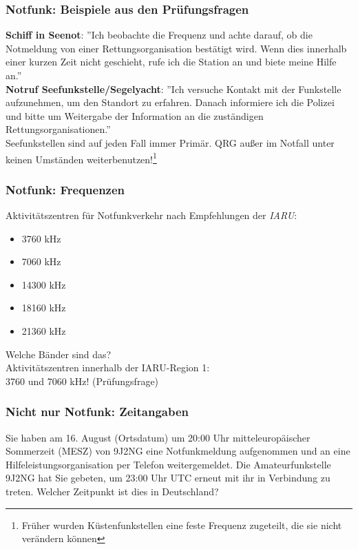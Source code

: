 \begin{frame}
    \frametitle{Notfunk: Beispiele aus den Prüfungsfragen}

    \textbf{Schiff in Seenot}: ''Ich beobachte die Frequenz und achte darauf, ob
    die Notmeldung von einer Rettungsorganisation bestätigt wird. Wenn dies
    innerhalb einer kurzen Zeit nicht geschieht, rufe ich die Station an und
    biete meine Hilfe an.'' \\[2em]

    \textbf{Notruf Seefunkstelle/Segelyacht}: ''Ich versuche Kontakt mit der
    Funkstelle aufzunehmen, um den Standort zu erfahren. Danach informiere ich
    die Polizei und bitte um Weitergabe der Information an die zuständigen
    Rettungsorganisationen.'' \\[2em]

    Seefunkstellen sind auf jeden Fall immer Primär. QRG außer im Notfall unter
    keinen Umständen weiterbenutzen!\footnote{Früher wurden Küstenfunkstellen
    eine feste Frequenz zugeteilt, die sie nicht verändern können}

\end{frame}

\begin{frame}
    \frametitle{Notfunk: Frequenzen}

    Aktivitätszentren für Notfunkverkehr nach Empfehlungen der \emph{IARU}:

    \begin{itemize}
        \item 3760 kHz
        \item 7060 kHz
        \item 14300 kHz
        \item 18160 kHz
        \item 21360 kHz
    \end{itemize}

    Welche Bänder sind das? \\[1em]

    Aktivitätszentren innerhalb der IARU-Region 1:\\
    3760 und 7060 kHz! (Prüfungsfrage)

\end{frame}

\begin{frame}
    \frametitle{Nicht nur Notfunk: Zeitangaben}

    \begin{block}{
        Sie haben am 16. August (Ortsdatum) um 20:00 Uhr mitteleuropäischer
        Sommerzeit (MESZ) von 9J2NG eine Notfunkmeldung aufgenommen und an eine
        Hilfeleistungsorganisation per Telefon weitergemeldet. Die Amateurfunkstelle
        9J2NG hat Sie gebeten, um 23:00 Uhr UTC erneut mit ihr in Verbindung zu
        treten. Welcher Zeitpunkt ist dies in Deutschland?}
    \end{block}

\end{frame}


